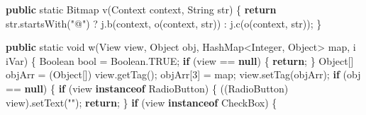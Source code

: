 \documentclass[
]{article}
\newenvironment{Shaded}{}{}
\newcommand{\BuiltInTok}[1]{\textcolor[rgb]{0.00,0.50,0.00}{#1}}
\newcommand{\ControlFlowTok}[1]{\textcolor[rgb]{0.00,0.44,0.13}{\textbf{#1}}}
\newcommand{\DataTypeTok}[1]{\textcolor[rgb]{0.56,0.13,0.00}{#1}}
\newcommand{\DecValTok}[1]{\textcolor[rgb]{0.25,0.63,0.44}{#1}}
\newcommand{\FunctionTok}[1]{\textcolor[rgb]{0.02,0.16,0.49}{#1}}
\newcommand{\KeywordTok}[1]{\textcolor[rgb]{0.00,0.44,0.13}{\textbf{#1}}}
\newcommand{\NormalTok}[1]{#1}
\newcommand{\OperatorTok}[1]{\textcolor[rgb]{0.40,0.40,0.40}{#1}}
\newcommand{\StringTok}[1]{\textcolor[rgb]{0.25,0.44,0.63}{#1}}
\begin{document}
\begin{Shaded}
\begin{Highlighting}[]
    \KeywordTok{public} \DataTypeTok{static}\NormalTok{ Bitmap }\FunctionTok{v}\OperatorTok{(}\BuiltInTok{Context}\NormalTok{ context}\OperatorTok{,} \BuiltInTok{String}\NormalTok{ str}\OperatorTok{)} \OperatorTok{\{}
        \ControlFlowTok{return}\NormalTok{ str}\OperatorTok{.}\FunctionTok{startsWith}\OperatorTok{(}\StringTok{"@"}\OperatorTok{)} \OperatorTok{?}\NormalTok{ j}\OperatorTok{.}\FunctionTok{b}\OperatorTok{(}\NormalTok{context}\OperatorTok{,} \FunctionTok{o}\OperatorTok{(}\NormalTok{context}\OperatorTok{,}\NormalTok{ str}\OperatorTok{))} \OperatorTok{:}\NormalTok{ j}\OperatorTok{.}\FunctionTok{c}\OperatorTok{(}\FunctionTok{o}\OperatorTok{(}\NormalTok{context}\OperatorTok{,}\NormalTok{ str}\OperatorTok{));}
    \OperatorTok{\}}

    \KeywordTok{public} \DataTypeTok{static} \DataTypeTok{void} \FunctionTok{w}\OperatorTok{(}\BuiltInTok{View}\NormalTok{ view}\OperatorTok{,} \BuiltInTok{Object}\NormalTok{ obj}\OperatorTok{,} \BuiltInTok{HashMap}\OperatorTok{\textless{}}\BuiltInTok{Integer}\OperatorTok{,} \BuiltInTok{Object}\OperatorTok{\textgreater{}}\NormalTok{ map}\OperatorTok{,}\NormalTok{ i iVar}\OperatorTok{)} \OperatorTok{\{}
        \BuiltInTok{Boolean}\NormalTok{ bool }\OperatorTok{=} \BuiltInTok{Boolean}\OperatorTok{.}\FunctionTok{TRUE}\OperatorTok{;}
        \ControlFlowTok{if} \OperatorTok{(}\NormalTok{view }\OperatorTok{==} \KeywordTok{null}\OperatorTok{)} \OperatorTok{\{}
            \ControlFlowTok{return}\OperatorTok{;}
        \OperatorTok{\}}
        \BuiltInTok{Object}\OperatorTok{[]}\NormalTok{ objArr }\OperatorTok{=} \OperatorTok{(}\BuiltInTok{Object}\OperatorTok{[])}\NormalTok{ view}\OperatorTok{.}\FunctionTok{getTag}\OperatorTok{();}
\NormalTok{        objArr}\OperatorTok{[}\DecValTok{3}\OperatorTok{]} \OperatorTok{=}\NormalTok{ map}\OperatorTok{;}
\NormalTok{        view}\OperatorTok{.}\FunctionTok{setTag}\OperatorTok{(}\NormalTok{objArr}\OperatorTok{);}
        \ControlFlowTok{if} \OperatorTok{(}\NormalTok{obj }\OperatorTok{==} \KeywordTok{null}\OperatorTok{)} \OperatorTok{\{}
            \ControlFlowTok{if} \OperatorTok{(}\NormalTok{view }\KeywordTok{instanceof}\NormalTok{ RadioButton}\OperatorTok{)} \OperatorTok{\{}
                \OperatorTok{((}\NormalTok{RadioButton}\OperatorTok{)}\NormalTok{ view}\OperatorTok{).}\FunctionTok{setText}\OperatorTok{(}\StringTok{""}\OperatorTok{);}
                \ControlFlowTok{return}\OperatorTok{;}
            \OperatorTok{\}}
            \ControlFlowTok{if} \OperatorTok{(}\NormalTok{view }\KeywordTok{instanceof}\NormalTok{ CheckBox}\OperatorTok{)} \OperatorTok{\{}

\end{Highlighting}
\end{Shaded}
\end{document}
